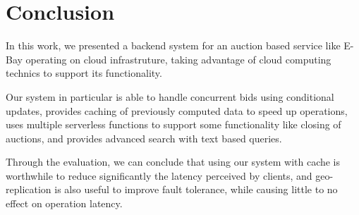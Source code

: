 \documentclass[runningheads]{llncs}
\begin{document}
\section{Conclusion}

In this work, we presented a backend system for an auction based service like E-Bay operating on cloud infrastruture, taking advantage of cloud computing technics to support its functionality. 

Our system in particular is able to handle concurrent bids using conditional updates, provides caching of previously computed data to speed up operations, uses multiple serverless functions to support some functionality like closing of auctions, and provides advanced search with text based queries.

Through the evaluation, we can conclude that using our system with cache is worthwhile to reduce significantly the latency perceived by clients, and geo-replication is also useful to improve fault tolerance, while causing little to no effect on operation latency. 
\end{document}
